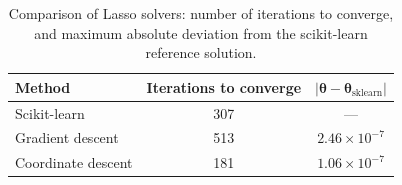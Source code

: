 \documentclass[reprint,english,notitlepage]{revtex4-2}  %
\begin{document}
\begin{table}[h]
    \centering
    \begin{tabular}{l c c}
        \toprule
        \textbf{Method} & Iterations to converge & $|\boldsymbol{\theta} - \boldsymbol{\theta}_{\text{sklearn}}|$ \\
        \midrule
        Scikit-learn        & 307 & --- \\
        Gradient descent    & 513 & $2.46 \times 10^{-7}$ \\
        Coordinate descent  & 181 & $1.06 \times 10^{-7}$ \\
        \bottomrule
    \end{tabular}
    \caption{Comparison of Lasso solvers: number of iterations to converge, and maximum absolute deviation from the scikit-learn reference solution.}
    \label{tab: Part g lasso comparison}
\end{table}\\
\end{document}
